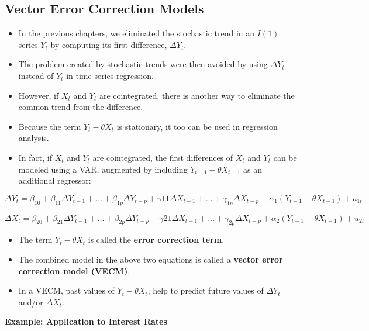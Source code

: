 \documentclass[]{book}
\providecommand{\tightlist}{%
  \setlength{\itemsep}{0pt}\setlength{\parskip}{0pt}}
\begin{document}
\hypertarget{vector-error-correction-models}{%
\subsection{Vector Error Correction Models}\label{vector-error-correction-models}}

\begin{itemize}
\tightlist
\item
  In the previous chapters, we eliminated the stochastic trend in an \(I(1)\) series \(Y_t\) by computing its first difference, \(\Delta Y_t.\)
\item
  The problem created by stochastic trends were then avoided by using \(\Delta Y_t\) instead of \(Y_t\) in time series regression.
\item
  However, if \(X_t\) and \(Y_t\) are cointegrated, there is another way to eliminate the common trend from the difference.
\item
  Because the term \(Y_t - \theta X_t\) is stationary, it too can be used in regression analysis.
\item
  In fact, if \(X_t\) and \(Y_t\) are cointegrated, the first differences of \(X_t\) and \(Y_t\) can be modeled using a VAR, augmented by including \(Y_{t-1} - \theta X_{t-1}\) as an additional regressor:
\end{itemize}

\[\Delta Y_t = \beta_{10} +\beta_{11}\Delta Y_{t-1}+\dots+\beta_{1p}\Delta Y_{t-p}+\gamma{11}\Delta X_{t-1}+\dots+\gamma_{1p}\Delta X_{t-p}+\alpha_1(Y_{t-1}-\theta X_{t-1}) + u_{1t}\]

\[\Delta X_t = \beta_{20} +\beta_{21}\Delta Y_{t-1}+\dots+\beta_{2p}\Delta Y_{t-p}+\gamma{21}\Delta X_{t-1}+\dots+\gamma_{2p}\Delta X_{t-p}+\alpha_2(Y_{t-1}-\theta X_{t-1}) + u_{2t}\]

\begin{itemize}
\tightlist
\item
  The term \(Y_t - \theta X_t\) is called the \textbf{error correction term}.
\item
  The combined model in the above two equations is called a \textbf{vector error correction model (VECM)}.
\item
  In a VECM, past values of \(Y_t - \theta X_t\), help to predict future values of \(\Delta Y_t\) and/or \(\Delta X_t\).
\end{itemize}

\textbf{Example: Application to Interest Rates}
\end{document}
